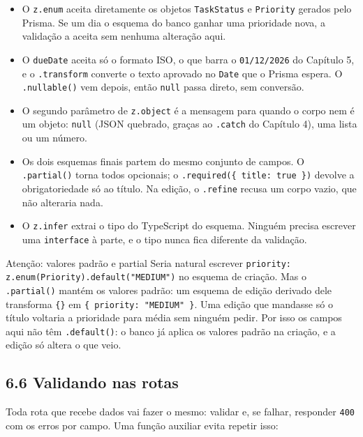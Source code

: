 \begin{itemize}
  \item O \texttt{z.enum} aceita diretamente os objetos \texttt{TaskStatus} e \texttt{Priority} gerados pelo Prisma. Se um dia o esquema do banco ganhar uma prioridade nova, a validação a aceita sem nenhuma alteração aqui.
  \item O \texttt{dueDate} aceita só o formato ISO, o que barra o \texttt{01/12/2026} do Capítulo 5, e o \texttt{.transform} converte o texto aprovado no \texttt{Date} que o Prisma espera. O \texttt{.nullable()} vem depois, então \texttt{null} passa direto, sem conversão.
  \item O segundo parâmetro de \texttt{z.object} é a mensagem para quando o corpo nem é um objeto: \texttt{null} (JSON quebrado, graças ao \texttt{.catch} do Capítulo 4), uma lista ou um número.
  \item Os dois esquemas finais partem do mesmo conjunto de campos. O \texttt{.partial()} torna todos opcionais; o \texttt{.required(\{ title: true \})} devolve a obrigatoriedade só ao título. Na edição, o \texttt{.refine} recusa um corpo vazio, que não alteraria nada.
  \item O \texttt{z.infer} extrai o tipo do TypeScript do esquema. Ninguém precisa escrever uma \texttt{interface} à parte, e o tipo nunca fica diferente da validação.
\end{itemize}

\begin{destaque}{Atenção: valores padrão e partial}
Seria natural escrever \texttt{priority: z.enum(Priority).default("MEDIUM")} no esquema de criação. Mas o \texttt{.partial()} mantém os valores padrão: um esquema de edição derivado dele transforma \texttt{\{\}} em \texttt{\{ priority: "MEDIUM" \}}. Uma edição que mandasse só o título voltaria a prioridade para média sem ninguém pedir. Por isso os campos aqui não têm \texttt{.default()}: o banco já aplica os valores padrão na criação, e a edição só altera o que veio.
\end{destaque}

\subsection{6.6 Validando nas rotas}

Toda rota que recebe dados vai fazer o mesmo: validar e, se falhar, responder \texttt{400} com os erros por campo. Uma função auxiliar evita repetir isso:

